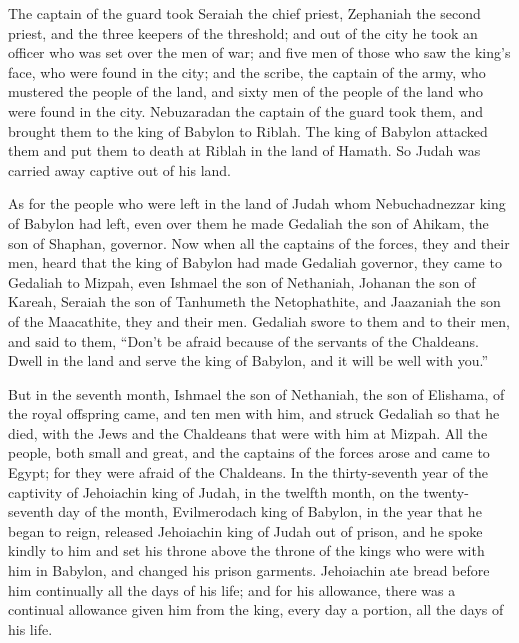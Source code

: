  The captain of the guard took Seraiah the chief priest,
Zephaniah the second priest, and the three keepers of the threshold;
 and out of the city he took an officer who was set over
the men of war; and five men of those who saw the king's face, who were
found in the city; and the scribe, the captain of the army, who mustered
the people of the land, and sixty men of the people of the land who were
found in the city.  Nebuzaradan the captain of the guard
took them, and brought them to the king of Babylon to Riblah.
 The king of Babylon attacked them and put them to death
at Riblah in the land of Hamath. So Judah was carried away captive out
of his land.

 As for the people who were left in the land of Judah
whom Nebuchadnezzar king of Babylon had left, even over them he made
Gedaliah the son of Ahikam, the son of Shaphan, governor.
 Now when all the captains of the forces, they and their
men, heard that the king of Babylon had made Gedaliah governor, they
came to Gedaliah to Mizpah, even Ishmael the son of Nethaniah, Johanan
the son of Kareah, Seraiah the son of Tanhumeth the Netophathite, and
Jaazaniah the son of the Maacathite, they and their men. 
Gedaliah swore to them and to their men, and said to them, ``Don't be
afraid because of the servants of the Chaldeans. Dwell in the land and
serve the king of Babylon, and it will be well with you.''

 But in the seventh month, Ishmael the son of Nethaniah,
the son of Elishama, of the royal offspring came, and ten men with him,
and struck Gedaliah so that he died, with the Jews and the Chaldeans
that were with him at Mizpah.  All the people, both small
and great, and the captains of the forces arose and came to Egypt; for
they were afraid of the Chaldeans.  In the thirty-seventh
year of the captivity of Jehoiachin king of Judah, in the twelfth month,
on the twenty-seventh day of the month, Evilmerodach king of Babylon, in
the year that he began to reign, released Jehoiachin king of Judah out
of prison,  and he spoke kindly to him and set his throne
above the throne of the kings who were with him in Babylon,
 and changed his prison garments. Jehoiachin ate bread
before him continually all the days of his life;  and for
his allowance, there was a continual allowance given him from the king,
every day a portion, all the days of his life.
